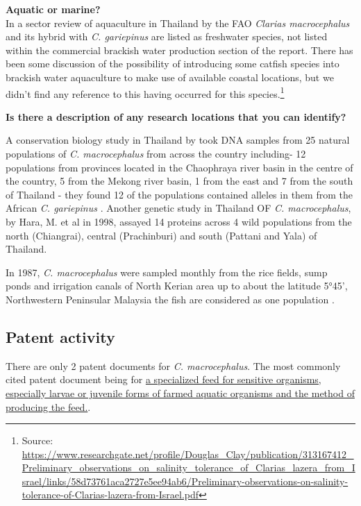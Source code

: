 \documentclass[]{book}
\theoremstyle{definition}
\theoremstyle{definition}
\theoremstyle{definition}
\theoremstyle{remark}
\begin{document}
\textbf{Aquatic or marine?}\\
In a sector review of aquaculture in Thailand by the FAO \emph{Clarias
macrocephalus} and its hybrid with \emph{C. gariepinus} are listed as
freshwater species, not listed within the commercial brackish water
production section of the report. There has been some discussion of the
possibility of introducing some catfish species into brackish water
aquaculture to make use of available coastal locations, but we didn't
find any reference to this having occurred for this species.\footnote{Source:
  \url{https://www.researchgate.net/profile/Douglas_Clay/publication/313167412_Preliminary_observations_on_salinity_tolerance_of_Clarias_lazera_from_Israel/links/58d73761aca2727e5ee94ab6/Preliminary-observations-on-salinity-tolerance-of-Clarias-lazera-from-Israel.pdf}}

\textbf{Is there a description of any research locations that you can
identify?}

A conservation biology study in Thailand by \citet{Na_Nakorn_2004} took
DNA samples from 25 natural populations of \emph{C. macrocephalus} from
across the country including- 12 populations from provinces located in
the Chaophraya river basin in the centre of the country, 5 from the
Mekong river basin, 1 from the east and 7 from the south of Thailand -
they found 12 of the populations contained alleles in them from the
African \emph{C. gariepinus} \citep{Na_Nakorn_2004}. Another genetic
study in Thailand OF \emph{C. macrocephalus}, by Hara, M. et al in 1998,
assayed 14 proteins across 4 wild populations from the north
(Chiangrai), central (Prachinburi) and south (Pattani and Yala) of
Thailand.

In 1987, \emph{C. macrocephalus} were sampled monthly from the rice
fields, sump ponds and irrigation canals of North Kerian area up to
about the latitude 5°45', Northwestern Peninsular Malaysia the fish are
considered as one population \citep{Ali_1993}.

\hypertarget{patent-activity}{%
\subsection{Patent activity}\label{patent-activity}}

There are only 2 patent documents for \emph{C. macrocephalus}. The most
commonly cited patent document being for
\href{https://www.lens.org/lens/patent/WO_2008_084074_A2}{a specialized
feed for sensitive organisms, especially larvae or juvenile forms of
farmed aquatic organisms and the method of producing the feed.}.
\end{document}
